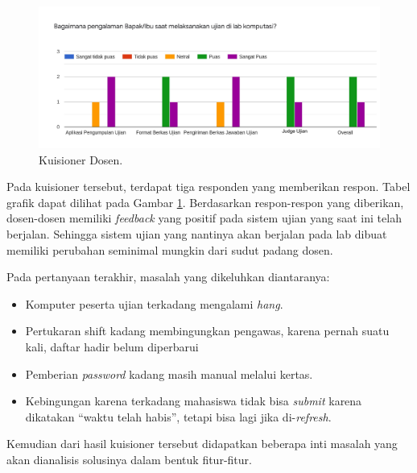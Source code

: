     \begin{figure}
        \centering
        \includegraphics[width=0.6\paperwidth]{Gambar/survey-dosen.pdf}
        \caption{Kuisioner Dosen.}
        \label{fig:kuisioner-dosen}
    \end{figure}

    Pada kuisioner tersebut, terdapat tiga responden yang memberikan respon.
    Tabel grafik dapat dilihat pada Gambar \ref{fig:kuisioner-dosen}.
    Berdasarkan respon-respon yang diberikan, dosen-dosen memiliki
    \textit{feedback} yang positif pada sistem ujian yang saat ini telah
    berjalan. Sehingga sistem ujian yang nantinya akan berjalan pada lab dibuat
    memiliki perubahan seminimal mungkin dari sudut padang dosen.

    Pada pertanyaan terakhir, masalah yang dikeluhkan diantaranya:
    \begin{itemize}
        \item Komputer peserta ujian terkadang mengalami \textit{hang}.
        
        \item Pertukaran shift kadang membingungkan pengawas, karena pernah
        suatu kali, daftar hadir belum diperbarui
        
        \item Pemberian \textit{password} kadang masih manual melalui kertas.
        
        \item Kebingungan karena terkadang mahasiswa tidak bisa \textit{submit}
        karena dikatakan ``waktu telah habis'', tetapi bisa lagi jika
        di-\textit{refresh}.
    \end{itemize}

    Kemudian dari hasil kuisioner tersebut didapatkan beberapa inti masalah yang akan
    dianalisis solusinya dalam bentuk fitur-fitur.
    
